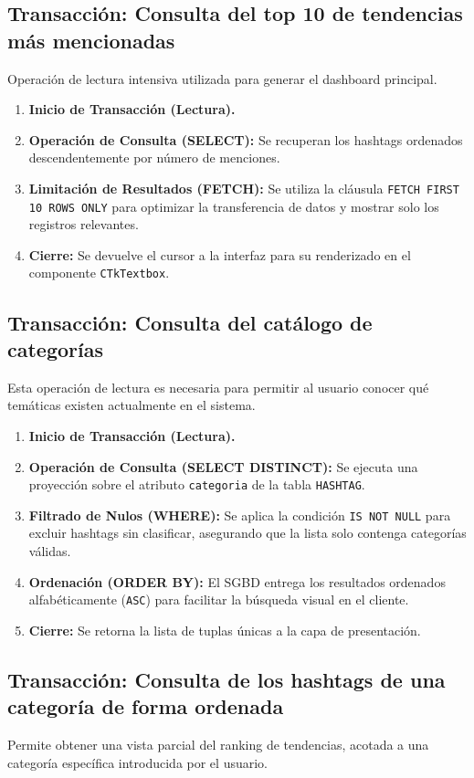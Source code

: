 \subsection{Transacción: Consulta del top 10 de tendencias más mencionadas} Operación de lectura intensiva utilizada para generar el dashboard principal.

\begin{enumerate} \item \textbf{Inicio de Transacción (Lectura).} \item \textbf{Operación de Consulta (SELECT):} Se recuperan los hashtags ordenados descendentemente por número de menciones. \item \textbf{Limitación de Resultados (FETCH):} Se utiliza la cláusula \texttt{FETCH FIRST 10 ROWS ONLY} para optimizar la transferencia de datos y mostrar solo los registros relevantes. \item \textbf{Cierre:} Se devuelve el cursor a la interfaz para su renderizado en el componente \texttt{CTkTextbox}. \end{enumerate}

\subsection{Transacción: Consulta del catálogo de categorías} Esta operación de lectura es necesaria para permitir al usuario conocer qué temáticas existen actualmente en el sistema.

\begin{enumerate} \item \textbf{Inicio de Transacción (Lectura).} \item \textbf{Operación de Consulta (SELECT DISTINCT):} Se ejecuta una proyección sobre el atributo \texttt{categoria} de la tabla \texttt{HASHTAG}. \item \textbf{Filtrado de Nulos (WHERE):} Se aplica la condición \texttt{IS NOT NULL} para excluir hashtags sin clasificar, asegurando que la lista solo contenga categorías válidas. \item \textbf{Ordenación (ORDER BY):} El SGBD entrega los resultados ordenados alfabéticamente (\texttt{ASC}) para facilitar la búsqueda visual en el cliente. \item \textbf{Cierre:} Se retorna la lista de tuplas únicas a la capa de presentación. \end{enumerate}

\subsection{Transacción: Consulta de los hashtags de una categoría de forma ordenada} Permite obtener una vista parcial del ranking de tendencias, acotada a una categoría específica introducida por el usuario.

